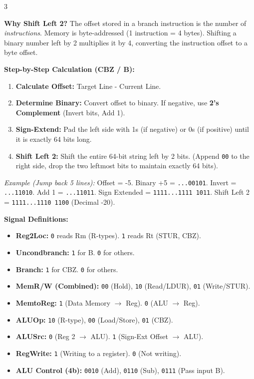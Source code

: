 \documentclass[8pt, letterpaper]{extarticle}
\begin{document}
\begin{multicols}{3}
\begin{tcolorbox}[colback=blue!5, colframe=black, boxrule=0.5pt, title=\textbf{Branch Target Math (Shift Left 2)}]
\textbf{Why Shift Left 2?} The offset stored in a branch instruction is the number of \textit{instructions}. Memory is byte-addressed (1 instruction = 4 bytes). Shifting a binary number left by 2 multiplies it by 4, converting the instruction offset to a byte offset.

\textbf{Step-by-Step Calculation (CBZ / B):}
\begin{enumerate}
    \item \textbf{Calculate Offset:} Target Line - Current Line.
    \item \textbf{Determine Binary:} Convert offset to binary. If negative, use \textbf{2's Complement} (Invert bits, Add 1).
    \item \textbf{Sign-Extend:} Pad the left side with 1s (if negative) or 0s (if positive) until it is exactly 64 bits long.
    \item \textbf{Shift Left 2:} Shift the entire 64-bit string left by 2 bits. (Append \texttt{00} to the right side, drop the two leftmost bits to maintain exactly 64 bits).
\end{enumerate}
\textit{Example (Jump back 5 lines):}
Offset = -5. Binary +5 = \texttt{...00101}. 
Invert = \texttt{...11010}. Add 1 = \texttt{...11011}.
Sign Extended = \texttt{1111...1111 1011}.
Shift Left 2 = \texttt{1111...1110 1100} (Decimal -20).
\end{tcolorbox}



\textbf{Signal Definitions:}
\begin{itemize}
    \item \textbf{Reg2Loc:} \texttt{0} reads Rm (R-types). \texttt{1} reads Rt (STUR, CBZ).
    \item \textbf{Uncondbranch:} \texttt{1} for B. \texttt{0} for others.
    \item \textbf{Branch:} \texttt{1} for CBZ. \texttt{0} for others.
    \item \textbf{MemR/W (Combined):} \texttt{00} (Hold), \texttt{10} (Read/LDUR), \texttt{01} (Write/STUR).
    \item \textbf{MemtoReg:} \texttt{1} (Data Memory $\to$ Reg). \texttt{0} (ALU $\to$ Reg).
    \item \textbf{ALUOp:} \texttt{10} (R-type), \texttt{00} (Load/Store), \texttt{01} (CBZ).
    \item \textbf{ALUSrc:} \texttt{0} (Reg 2 $\to$ ALU). \texttt{1} (Sign-Ext Offset $\to$ ALU).
    \item \textbf{RegWrite:} \texttt{1} (Writing to a register). \texttt{0} (Not writing).
    \item \textbf{ALU Control (4b):} \texttt{0010} (Add), \texttt{0110} (Sub), \texttt{0111} (Pass input B).
\end{itemize}














\end{multicols}
\end{document}
